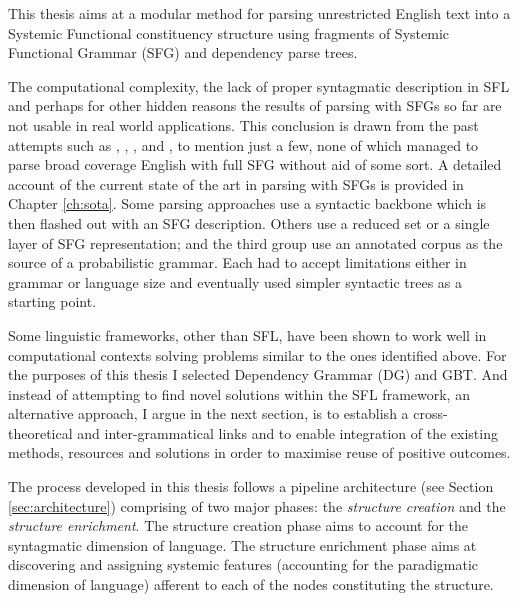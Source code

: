 This thesis aims at a modular method for parsing unrestricted English text into a Systemic Functional constituency structure using fragments of Systemic Functional Grammar (SFG) and dependency parse trees.

The computational complexity, the lack of proper syntagmatic description in SFL and perhaps for other hidden reasons the results of parsing with SFGs so far are not usable in real world applications. This conclusion is drawn from the past attempts such as \citet{Kasper1988}, \citet{Kay1985}, \citet{ODonoghue1991a}, \citet{ODonnell1993} and \citet{Day2007}, to mention just a few, none of which managed to parse broad coverage English with full SFG without aid of some sort. A detailed account of the current state of the art in parsing with SFGs is provided in Chapter \ref{ch:sota}. Some parsing approaches use a syntactic backbone which is then flashed out with an SFG description. Others use a reduced set or a single layer of SFG representation; and the third group use an annotated corpus as the source of a probabilistic grammar. Each had to accept limitations either in grammar or language size and eventually used simpler syntactic trees as a starting point.%


Some linguistic frameworks, other than SFL, have been shown to work well in computational contexts solving problems similar to the ones identified above. For the purposes of this thesis I selected Dependency Grammar (DG) and GBT. And instead of attempting to find novel solutions within the SFL framework, an alternative approach, I argue in the next section, is to establish a cross-theoretical and inter-grammatical links and to enable integration of the existing methods, resources and solutions in order to maximise reuse of positive outcomes.

The process developed in this thesis follows a pipeline architecture (see Section \ref{sec:architecture}) comprising of two major phases: the \textit{structure creation} and the \textit{structure enrichment}. The structure creation phase aims to account for the syntagmatic dimension of language. %
The structure enrichment phase aims at discovering and assigning systemic features (accounting for the paradigmatic dimension of language) afferent to each of the nodes constituting the structure. 


